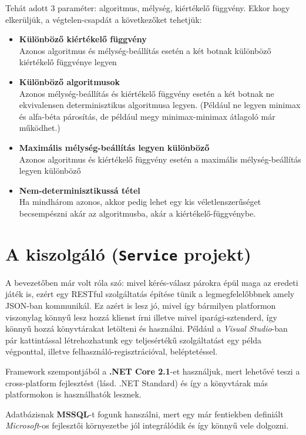 \documentclass[twoside, a4paper, 12pt]{book}
\begin{document}
Tehát adott 3 paraméter: algoritmus, mélység, kiértékelő függvény. Ekkor hogy elkerüljük, a végtelen-csapdát a következőket tehetjük:
\begin{itemize}
	\item \textbf{Különböző kiértékelő függvény} \\ 
	Azonos algoritmus és mélység-beállítás esetén a két botnak különböző kiértékelő függvénye legyen
	
	\item \textbf{Különböző algoritmusok} \\
	Azonos mélység-beállítás és kiértékelő függvény esetén a két botnak ne ekvivalensen determinisztikus algoritmusa legyen. (Például ne legyen minimax és alfa-béta párosítás, de például megy minimax-minimax átlagoló már működhet.)
	
	\item \textbf{Maximális mélység-beállítás legyen különböző} \\
	Azonos algoritmus és kiértékelő függvény esetén a maximális mélység-beállítás legyen különböző
	
	\item \textbf{Nem-determinisztikussá tétel} \\
	Ha mindhárom azonos, akkor pedig lehet egy kis véletlenszerűséget becsempészni akár az algoritmusba, akár a kiértékelő-függvénybe.
\end{itemize}

\section{A kiszolgáló (\texttt{Service} projekt)}
A bevezetőben már volt róla szó: mivel kérés-válasz párokra épül maga az eredeti játék is, ezért egy RESTful szolgáltatás építése tünik a legmegfelelőbbnek amely JSON-ban kommunikál. Ez azért is lesz jó, mivel így bármilyen platformon viszonylag könnyű lesz hozzá klienst írni illetve mivel iparági-sztenderd, így könnyű hozzá könyvtárakat letölteni és használni. Például a \textit{Visual Studio}-ban pár kattintással létrehozhatunk egy teljesértékű szolgáltatást egy példa végponttal, illetve felhasználó-regisztrációval, beléptetéssel.

Framework szempontjából a \textbf{.NET Core 2.1}-et használjuk, mert lehetővé teszi a cross-platform fejlesztést (lásd. .NET Standard) és így a könyvtárak más platformokon is használhatók lesznek.

Adatbázisnak \textbf{MSSQL}-t fogunk hanszálni, mert egy már fentiekben definiált \textit{Microsoft}-os fejlesztői környezetbe jól integrálódik és így könnyű vele dolgozni.
\end{document}

